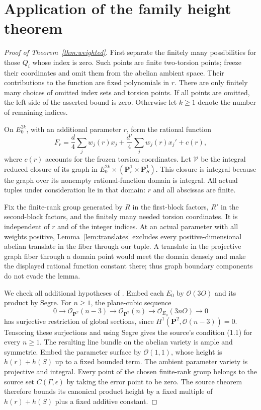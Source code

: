 \documentclass[11pt,a4paper]{article}
\begin{document}
\section{Application of the family height theorem}
\begin{proof}[Proof of Theorem~\ref{thm:weighted}]
First separate the finitely many possibilities for those $Q_i$ whose
index is zero. Such points are finite two-torsion points; freeze their
coordinates and omit them from the abelian ambient space. Their
contributions to the function are fixed polynomials in $r$. There are
only finitely many choices of omitted index sets and torsion points.
If all points are omitted, the left side of the asserted bound is zero.
Otherwise let $k\ge1$ denote the number of remaining indices.

On $E_0^{2k}$, with an additional parameter $r$, form the rational
function
\[
 F_r=\frac d4\sum_j w_j(r)x_j+
       \frac {d'}4\sum_j w_j(r)x_j'+c(r),
\]
where $c(r)$ accounts for the frozen torsion coordinates. Let
$\mathcal V$ be the integral reduced closure of its graph in
$E_0^{2k}\times(\mathbf P^1_r\times\mathbf P^1_S)$. This closure is
integral because the graph over its nonempty rational-function domain
is integral. All actual tuples under consideration lie in that domain:
$r$ and all abscissas are finite.

Fix the finite-rank group generated by $R$ in the first-block factors,
$R'$ in the second-block factors, and the finitely many needed torsion
coordinates. It is independent of $r$ and of the integer indices.
At an actual parameter with all weights positive,
Lemma~\ref{lem:translates} excludes every positive-dimensional abelian
translate in the fiber through our tuple. A translate in the projective
graph fiber through a domain point would meet the domain densely and
make the displayed rational function constant there; thus graph
boundary components do not evade the lemma.

We check all additional hypotheses of \cite[Theorem~1.1, p.~308]{VB}.
Embed each $E_0$ by $\mathcal O(3O)$ and its product by Segre. For
$n\ge1$, the plane-cubic sequence
\[
0\to\mathcal O_{\mathbf P^2}(n-3)\to\mathcal O_{\mathbf P^2}(n)
 \to\mathcal O_{E_0}(3nO)\to0
\]
has surjective restriction of global sections, since
$H^1(\mathbf P^2,\mathcal O(n-3))=0$. Tensoring these surjections
and using Segre gives the source's condition (1.1) for every $n\ge1$.
The resulting line bundle on the abelian variety is ample and symmetric.
Embed the parameter surface by $\mathcal O(1,1)$, whose height is
$h(r)+h(S)$ up to a fixed bounded term. The ambient parameter variety
is projective and integral. Every point of the chosen finite-rank group
belongs to the source set $C(\Gamma,\epsilon)$ by taking the error point
to be zero. The source theorem therefore bounds its canonical product
height by a fixed multiple of $h(r)+h(S)$ plus a fixed additive constant.


\end{proof}
\end{document}
